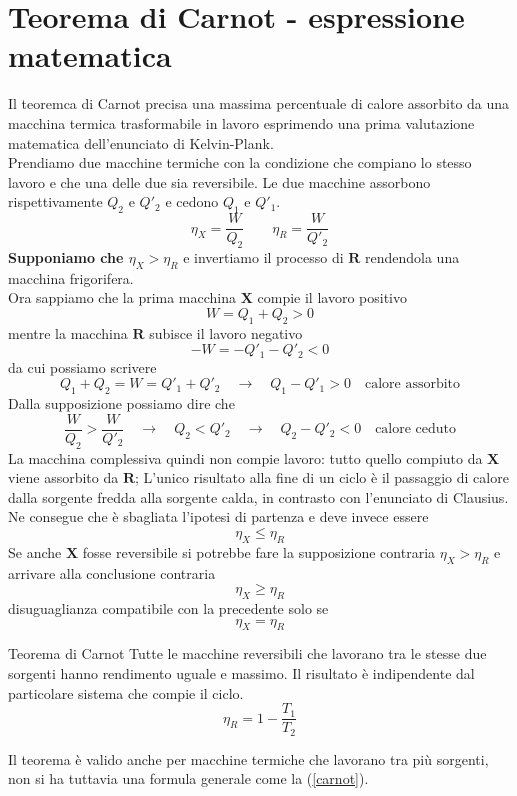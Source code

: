 \documentclass[x11names]{report}
\begin{document}
\section{Teorema di Carnot - espressione matematica}
Il teoremca di Carnot precisa una massima percentuale di calore assorbito da una macchina termica trasformabile in lavoro esprimendo una prima valutazione matematica dell'enunciato di Kelvin-Plank.\\

\noindent
Prendiamo due macchine termiche con la condizione che compiano lo stesso lavoro e che una delle due sia reversibile. Le due macchine assorbono rispettivamente \(Q_{2}\) e \(Q'_{2}\) e cedono \(Q_{1}\) e \(Q'_{1}\). 
\[ 
\eta_X = \frac{W}{Q_{2}} \qquad \eta_R = \frac{W}{Q'_{2}}
\]
\textbf{Supponiamo che \(\eta_X > \eta_R\)} e invertiamo il processo di \(\boldsymbol{R}\) rendendola una macchina frigorifera. \\

\noindent
Ora sappiamo che la prima macchina \(\boldsymbol{X}\) compie il lavoro positivo
\[ 
W = Q_{1} + Q_{2} > 0
\]
mentre la macchina \(\boldsymbol{R}\) subisce il lavoro negativo
\[ 
-W = -Q'_{1} - Q'_{2} < 0
\]
da cui possiamo scrivere
\[ 
Q_{1} + Q_{2} = W = Q'_{1} + Q'_{2}  \quad \to \quad \boxed{Q_{1} - Q'_{1} > 0} \quad \text{calore assorbito}
\]
Dalla supposizione possiamo dire che
\[ 
\frac{W}{Q_{2}} >  \frac{W}{Q'_{2}} \quad \to \quad Q_{2} < Q'_{2}  \quad \to \quad  \boxed{Q_{2} - Q'_{2} < 0} \quad \text{calore ceduto}
\]
La macchina complessiva quindi non compie lavoro: tutto quello compiuto da \(\boldsymbol{X}\) viene assorbito da \(\boldsymbol{R}\); L'unico risultato alla fine di un ciclo è il passaggio di calore dalla sorgente fredda alla sorgente calda, in contrasto con l’enunciato di Clausius. Ne consegue che è sbagliata l’ipotesi di partenza e deve invece essere
\[ 
\eta_X \leq \eta_R
\]
Se anche \(\boldsymbol{X}\) fosse reversibile si potrebbe fare la supposizione contraria \(\eta_X > \eta_R\) e arrivare alla conclusione contraria
\[ 
\eta_X \geq \eta_R
\]
disuguaglianza compatibile con la precedente solo se
\[ 
\eta_X = \eta_R
\]
\begin{center}
	\colorbox{yred}{\begin{minipage}{5.75in}
			\begin{redes}{Teorema di Carnot}
					Tutte le macchine reversibili che lavorano tra le stesse due sorgenti hanno rendimento uguale e massimo. Il risultato è indipendente dal particolare sistema che compie il ciclo.
					\begin{equation}\label{carnot}
						\eta_R = 1 - \frac{T_{1}}{T_{2}}
					\end{equation}
			\end{redes}
	\end{minipage}}
\end{center}
Il teorema è valido anche per macchine termiche che lavorano tra più sorgenti, non si ha tuttavia una formula generale come la (\ref{carnot}).\\
\end{document}
